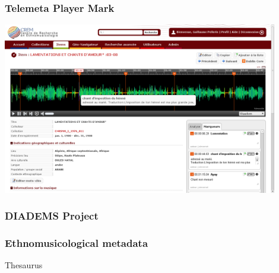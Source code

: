 \documentclass[10pt, final, hyperref, table]{beamer}
\begin{document}
\begin{frame}\frametitle{Telemeta Player Mark}
  \vspace{-1cm}
  \begin{center}
    \includegraphics[width=12cm]{../../Common/img/shots/player_mark.png}
  \end{center}

\end{frame}
\begin{frame}
\frametitle{DIADEMS Project}
  
\end{frame}
\begin{frame}
\frametitle{Ethnomusicological metadata}
\begin{block}{Thesaurus}
  
\end{block}
\end{frame}
\end{document}
